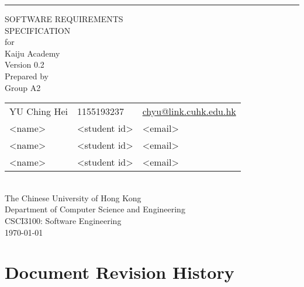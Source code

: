 \documentclass[a4paper, 11pt]{scrreprt}
\date{}
\def\myversion{0.2}
\def\projectname{Kaiju Academy}  %
\begin{document}

\begin{titlepage}
    \begin{flushright}
        \rule{\textwidth}{5pt}\vskip1cm
        \begin{bfseries}
            \Huge{SOFTWARE REQUIREMENTS\\ SPECIFICATION}\\
            \vspace{1.6cm}
            for\\
            \vspace{1.6cm}
            \projectname\\  %
            \vspace{1.6cm}
            \LARGE{Version \myversion}\\
            \vspace{1.6cm}
            Prepared by\\
            Group A2\\
            \begin{tabularx}{\textwidth}{X l X}
            YU Ching Hei & 1155193237 & \href{mailto:chyu@link.cuhk.edu.hk}{chyu@link.cuhk.edu.hk}\\
            <name> & <student id> & <email>\\
            <name> & <student id> & <email>\\
            <name> & <student id> & <email>\\
            \end{tabularx}\\
            \vspace{1.6cm}
            The Chinese University of Hong Kong\\
            Department of Computer Science and Engineering\\
            CSCI3100: Software Engineering\\
            \vspace{1.6cm}
            \today\\
        \end{bfseries}
    \end{flushright}
\end{titlepage}

\tableofcontents


\chapter{Document Revision History}
\end{document}
